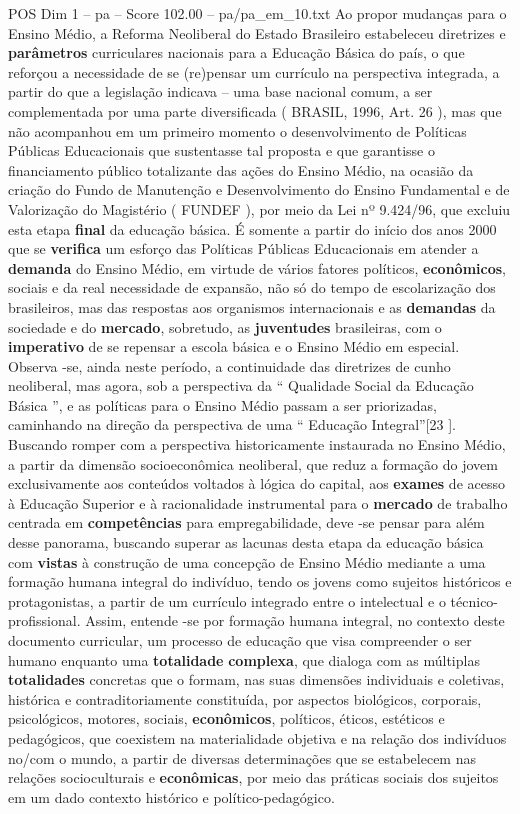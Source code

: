 \begin{textsample}{POS Dim 1 – pa – Score 102.00 – pa/pa\_em\_10.txt}
Ao propor mudanças para o Ensino Médio, a Reforma Neoliberal do Estado Brasileiro estabeleceu diretrizes e \textbf{parâmetros} curriculares nacionais para a Educação Básica do país, o que reforçou a necessidade de se (re)pensar um currículo na perspectiva integrada, a partir do que a legislação indicava – uma base nacional comum, a ser complementada por uma parte diversificada ( BRASIL, 1996, Art. 26 ), mas que não acompanhou em um primeiro momento o desenvolvimento de Políticas Públicas Educacionais que sustentasse tal proposta e que garantisse o financiamento público totalizante das ações do Ensino Médio, na ocasião da criação do Fundo de Manutenção e Desenvolvimento do Ensino Fundamental e de Valorização do Magistério ( FUNDEF ), por meio da Lei nº 9.424/96, que excluiu esta etapa \textbf{final} da educação básica.
É somente a partir do início dos anos 2000 que se \textbf{verifica} um esforço das Políticas Públicas Educacionais em atender a \textbf{demanda} do Ensino Médio, em virtude de vários fatores políticos, \textbf{econômicos}, sociais e da real necessidade de expansão, não só do tempo de escolarização dos brasileiros, mas das respostas aos organismos internacionais e as \textbf{demandas} da sociedade e do \textbf{mercado}, sobretudo, as \textbf{juventudes} brasileiras, com o \textbf{imperativo} de se repensar a escola básica e o Ensino Médio em especial.
Observa -se, ainda neste período, a continuidade das diretrizes de cunho neoliberal, mas agora, sob a perspectiva da “ Qualidade Social da Educação Básica ”, e as políticas para o Ensino Médio passam a ser priorizadas, caminhando na direção da perspectiva de uma “ Educação Integral”[23 ].
Buscando romper com a perspectiva historicamente instaurada no Ensino Médio, a partir da dimensão socioeconômica neoliberal, que reduz a formação do jovem exclusivamente aos conteúdos voltados à lógica do capital, aos \textbf{exames} de acesso à Educação Superior e à racionalidade instrumental para o \textbf{mercado} de trabalho centrada em \textbf{competências} para empregabilidade, deve -se pensar para além desse panorama, buscando superar as lacunas desta etapa da educação básica com \textbf{vistas} à construção de uma concepção de Ensino Médio mediante a uma formação humana integral do indivíduo, tendo os jovens como sujeitos históricos e protagonistas, a partir de um currículo integrado entre o intelectual e o técnico-profissional.
Assim, entende -se por formação humana integral, no contexto deste documento curricular, um processo de educação que visa compreender o ser humano enquanto uma \textbf{totalidade} \textbf{complexa}, que dialoga com as múltiplas \textbf{totalidades} concretas que o formam, nas suas dimensões individuais e coletivas, histórica e contraditoriamente constituída, por aspectos biológicos, corporais, psicológicos, motores, sociais, \textbf{econômicos}, políticos, éticos, estéticos e pedagógicos, que coexistem na materialidade objetiva e na relação dos indivíduos no/com o mundo, a partir de diversas determinações que se estabelecem nas relações socioculturais e \textbf{econômicas}, por meio das práticas sociais dos sujeitos em um dado contexto histórico e político-pedagógico.

\end{textsample}
